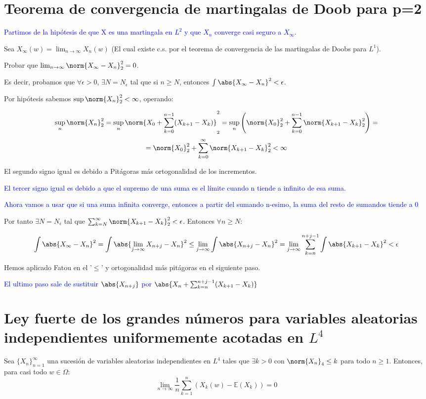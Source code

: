\documentclass{apuntes}
\begin{document}
\section{Teorema de convergencia de martingalas de Doob para p=2}
\textcolor{blue}{Partimos de la hipótesis de que X es una martingala en $L^2$ y que $X_n$ converge casi seguro a $X_{\infty}$.}

Sea $X_{\infty}(w)=\lim_{n \rightarrow \infty} X_n(w)$ (El cual existe c.s. por el teorema de convergencia de las martingalas de Doobs para $L^1$).

Probar que $\lim_{n \rightarrow \infty}\norm{X_{\infty}-X_n}_2^2=0$.


Es decir, probamos que $\forall \epsilon > 0$, $\exists N = N_{\epsilon}$ tal que si $n\geq N$, entonces $\int \abs{X_{\infty}-X_n}^2 < \epsilon$.

Por hipótesis sabemos $\sup \norm{X_n}_2^2 < \infty$, operando:

\[
\sup_n \norm{X_n}_2^2 = \sup_n \norm{X_0 +\sum_{k=0}^{n-1}(X_{k+1}-X_k)}_2^2 = \sup_n \left( \norm{X_0}_2^2 +\sum_{k=0}^{n-1}\norm{X_{k+1}-X_k}_2^2 \right) =
\]
\[
= \norm{X_0}_2^2 +\sum_{k=0}^{\infty}\norm{X_{k+1}-X_k}_2^2 < \infty
\]

El segundo signo igual es debido a Pitágoras más ortogonalidad de los incrementos.

\textcolor{blue}{El tercer signo igual es debido a que el supremo de una suma es el límite cuando n tiende a infinito de esa suma.}

\textcolor{blue}{Ahora vamos a usar que si una suma infinita converge, entonces a partir del sumando n-esimo, la suma del resto de sumandos tiende a 0}

Por tanto $\exists N = N_{\epsilon}$ tal que $\sum_{k=N}^{\infty} \norm{X_{k+1}-X_k}_2^2 < \epsilon$. Entonces $\forall n \geq N$:

\[
\int \abs{X_{\infty}-X_n}^2 = \int \abs{\lim_{j \rightarrow \infty} X_{n+j}-X_n}^2 \leq \lim_{j \rightarrow \infty} \int \abs{ X_{n+j}-X_n}^2 = \lim_{j \rightarrow \infty} \sum_{k=n}^{n+j-1}\int \abs{X_{k+1}-X_k}^2 < \epsilon
\]

Hemos aplicado Fatou en el '$\leq$' y ortogonalidad más pitágoras en el siguiente paso.


\textcolor{blue}{El ultimo paso sale de sustituir $\abs{X_{n+j}}$ por $\abs{X_n + \sum_{k=n}^{n+j-1}(X_{k+1}-X_k)}$}


\section{Ley fuerte de los grandes números para variables aleatorias independientes uniformemente acotadas en $L^4$}
Sea $\{X_n\}_{n=1}^{\infty}$ una sucesión de variables aleatorias independientes en $L^4$ tales que $\exists k>0$ con $\norm{X_n}_4 \leq k$ para todo $n \geq 1$. Entonces, para casi todo $w \in \Omega$:
\[
\lim_{n \rightarrow \infty} \frac{1}{n}\sum_{k=1}^{n}\left( X_k(w) - \mathbb{E}(X_k) \right)= 0
\]
\end{document}
